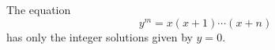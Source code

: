 \begin{proposition}\label{eq:167}
    The equation
\[
    y^m=x(x+1)\cdots(x+n)
\]
    has only the integer solutions given by $y=0$.
\end{proposition}
